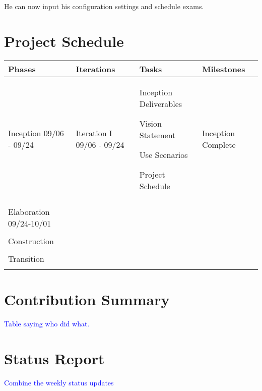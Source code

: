 \documentclass[11pt]{article}
\newenvironment{packed_itemize}{
\begin{itemize}
  \setlength{\itemsep}{1pt}
  \setlength{\parskip}{0pt}
  \setlength{\parsep}{0pt}
}{\end{itemize}}
\begin{document}
\begin{description}
He can now input his configuration settings and schedule exams. 



\end{description}



\section{Project Schedule} %

\begin{table}
\centering %
\begin{tabular}{|p{0.9in}|p{0.9in}|p{3.2in}|p{.9in}|}
\hline
\textbf{Phases}  & \textbf{Iterations}  & \textbf{Tasks}        & \textbf{Milestones} \\
\hline\hline
 Inception 09/06 - 09/24
   &  Iteration I 09/06 - 09/24  
	& Inception Deliverables
	\vspace{-0.15in}
	 \begin{packed_itemize} 
		\item Vision Statement
		\item Use Scenarios
		\item Project Schedule
   \end{packed_itemize}
	& Inception Complete\\
   &        & & \\
\hline
Elaboration 09/24-10/01& & &\\
& & & \\
\hline
Construction &&& \\
&&& \\
\hline
Transition &&& \\
&&& \\
\hline
\end{tabular}
\end{table}

\section{Contribution Summary} %
\textcolor{blue}{Table saying who did what.}

\section{Status Report} %
\textcolor{blue}{Combine the weekly status updates}
\end{document}
